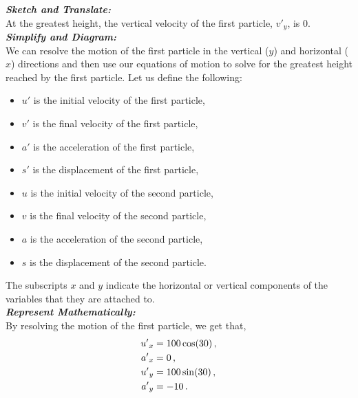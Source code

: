 \begin{subquestions}
	
\subquestion

\textbf{\textit{Sketch and Translate:}} \\
At the greatest height, the vertical velocity of the first particle, $v'_y$, is 0.\\




\textbf{\textit{Simplify and Diagram:}} \\
We can resolve the motion of the first particle in the vertical ($y$) and horizontal ($x$) directions and then use our equations of motion to solve for the greatest height reached by the first particle. Let us define the following:
\begin{itemize}
	\item ${u'}$ is the initial velocity of the first particle,
	\item ${v'}$ is the final velocity of the first particle,
	\item ${a'}$ is the acceleration of the first particle,
	\item ${s'}$ is the displacement of the first particle,
	\item $u$ is the initial velocity of the second particle,
	\item $v$ is the final velocity of the second particle,
	\item $a$ is the acceleration of the second particle,
	\item $s$ is the displacement of the second particle.
\end{itemize}
The subscripts $x$ and $y$ indicate the horizontal or vertical components of the variables that they are attached to.\\



\textbf{\textit{Represent Mathematically:}} \\
By resolving the motion of the first particle, we get that,
\begin{align}
	{u'}_x & = 100 \cos(30) \,, \nonumber \\
	{a'}_x & = 0 \,, \nonumber \\
	{u'}_y & = 100 \sin(30) \,, \nonumber \\
	{a'}_y & = -10 \,. 
\end{align}


\end{subquestions}

